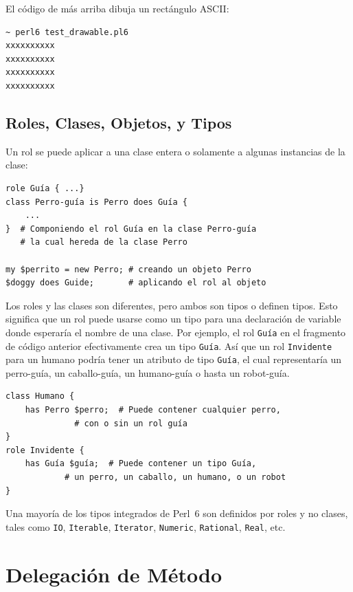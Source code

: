 El código de más arriba dibuja un rectángulo ASCII:
\begin{lstlisting}
~ perl6 test_drawable.pl6
xxxxxxxxxx
xxxxxxxxxx
xxxxxxxxxx
xxxxxxxxxx
\end{lstlisting}

\subsection{Roles, Clases, Objetos, y Tipos}

Un rol se puede aplicar a una clase entera o solamente a 
algunas instancias de la clase:

\begin{lstlisting}
role Guía { ...}
class Perro-guía is Perro does Guía { 
    ... 
}  # Componiendo el rol Guía en la clase Perro-guía
   # la cual hereda de la clase Perro

my $perrito = new Perro; # creando un objeto Perro
$doggy does Guide;       # aplicando el rol al objeto
\end{lstlisting}

Los roles y las clases son diferentes, pero ambos son tipos
o definen tipos. Esto significa que un rol puede usarse como
un tipo para una declaración de variable donde esperaría el 
nombre de una clase. Por ejemplo, el rol {\tt Guía} en el fragmento
de código anterior efectivamente crea un tipo {\tt Guía}. Así que
un rol {\tt Invidente} para un humano podría tener un atributo
de tipo {\tt Guía}, el cual representaría un perro-guía, un 
caballo-guía, un humano-guía o hasta un robot-guía.

\begin{lstlisting}
class Humano {
    has Perro $perro;  # Puede contener cualquier perro,
    		  # con o sin un rol guía
}
role Invidente {
    has Guía $guía;  # Puede contener un tipo Guía, 
    	  	# un perro, un caballo, un humano, o un robot
}
\end{lstlisting}


Una mayoría de los tipos integrados de Perl~6 son definidos
por roles y no clases, tales como {\tt IO}, {\tt Iterable}, 
{\tt Iterator}, {\tt Numeric}, {\tt Rational}, {\tt Real},
etc.

\section{Delegación de Método}


